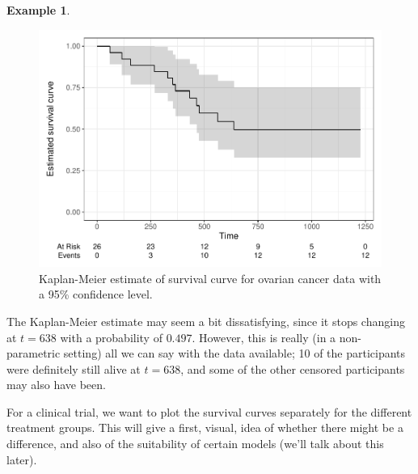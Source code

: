 \documentclass[
  openany]{book}
\theoremstyle{definition}
\theoremstyle{definition}
\newtheorem{example}{Example}[chapter]
\theoremstyle{definition}
\theoremstyle{definition}
\theoremstyle{remark}
\begin{document}
\begin{example}
\begin{figure}
\centering
\includegraphics{CT4H_notes_files/figure-latex/kmov2-1.pdf}
\caption{\label{fig:kmov2}Kaplan-Meier estimate of survival curve for ovarian cancer data with a 95\% confidence level.}
\end{figure}

The Kaplan-Meier estimate may seem a bit dissatisfying, since it stops changing at \(t=638\) with a probability of \(0.497\). However, this is really (in a non-parametric setting) all we can say with the data available; 10 of the participants were definitely still alive at \(t=638\), and some of the other censored participants may also have been.
\end{example}

For a clinical trial, we want to plot the survival curves separately for the different treatment groups. This will give a first, visual, idea of whether there might be a difference, and also of the suitability of certain models (we'll talk about this later).
\end{document}
